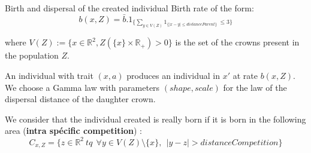 \documentclass{myBeamer}
\newcommand{\R}{\mathbb R}%
\begin{document}
\begin{frame}{Birth and dispersal of the created individual}
Birth rate of the form:
\begin{equation*}
b(x,Z) = \bar{b}. 1_{\{ \sum_{y \in V(Z) } 1_{ \{  |x-y|\leq distanceParent \} } ~ \leq 3  \}  }
\end{equation*}

where $V(Z) := \{ x \in \R^2, Z( \{x\} \times  \R_+ ) >0  \}$ is the set of the crowns present in the population $Z$. 

\bigbreak
\begin{minipage}{0.55\linewidth}
An individual with trait $(x,a)$ produces an individual in $x'$ at rate $b(x,Z)$.
We choose a Gamma law with parameters $(shape,scale)$ for the law of the dispersal distance of the daughter crown.
\end{minipage}
\begin{minipage}{0.35\linewidth}
\begin{figure}[H] 
\end{figure}
\end{minipage}

We consider that the individual created is really born if it is born in the following area (\textbf{intra spécific competition}) :
\begin{equation*}
 C_{x,Z} = \{  z \in \R^2 ~ tq  ~~\forall y \in V(Z)\setminus \{x \}, ~~ |y-z|>distanceCompetition \}  
\end{equation*} 

\end{frame}
\end{document}
